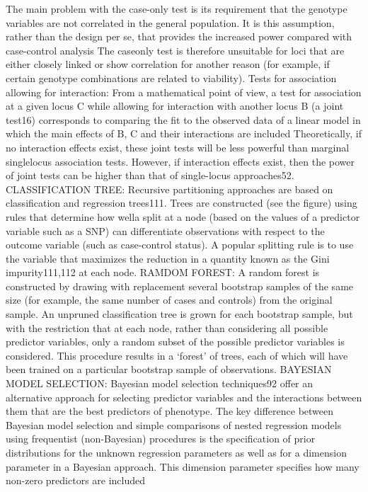 	The main problem with the case-only test is its requirement that the genotype variables are not correlated in the general population. It is this assumption, rather than the design per se, that provides the increased power compared with case-control analysis \cite{cordell2009detecting}
	The caseonly test is therefore unsuitable for loci that are either closely linked or show correlation for another reason (for example, if certain genotype combinations are related to viability). \cite{cordell2009detecting}
Tests for association allowing for interaction: From a mathematical point of view, a test for association at a given locus C while allowing for interaction with another locus B (a joint test16) corresponds to comparing the fit to the observed data of a linear model in which the main effects of B, C and their interactions are included  \cite{cordell2009detecting}
Theoretically, if no interaction effects exist, these joint tests will be less powerful than marginal singlelocus association tests. However, if interaction effects exist, then the power of joint tests can be higher than that of single-locus approaches52. \cite{cordell2009detecting}
CLASSIFICATION TREE: Recursive partitioning approaches are based on classification and regression trees111. Trees are constructed (see the figure) using rules that determine how wella split at a node (based on the values of a predictor variable such as a SNP) can differentiate observations with respect to the outcome variable (such as case-control status). A popular splitting rule is to use the variable that maximizes the reduction in a quantity known as the Gini impurity111,112 at each node.  \cite{cordell2009detecting}
RAMDOM FOREST: A random forest is constructed by drawing with replacement several bootstrap samples of the same size (for example, the same number of cases and controls) from the original sample. An unpruned classification tree is grown for each bootstrap sample, but with the restriction that at each node, rather than considering all possible predictor variables, only a random subset of the possible predictor variables is considered. This procedure results in a `forest' of trees, each of which will have been trained on a particular bootstrap sample of observations. \cite{cordell2009detecting}
BAYESIAN MODEL SELECTION: Bayesian model selection techniques92 offer an alternative approach for selecting predictor variables and the interactions between them that are the best predictors of phenotype. The key difference between Bayesian model selection and simple comparisons of nested regression models using frequentist (non-Bayesian) procedures is the specification of prior distributions for the unknown regression parameters as well as for a dimension parameter in a Bayesian approach. This dimension parameter specifies how many non-zero predictors are included \cite{cordell2009detecting}
